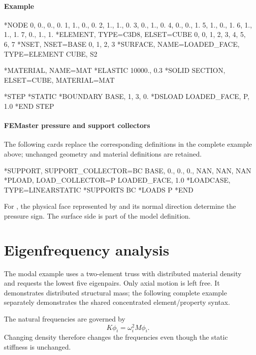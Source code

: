 \paragraph*{Example}

\begin{inputdeck}
*NODE
0, 0., 0., 0.
1, 1., 0., 0.
2, 1., 1., 0.
3, 0., 1., 0.
4, 0., 0., 1.
5, 1., 0., 1.
6, 1., 1., 1.
7, 0., 1., 1.
*ELEMENT, TYPE=C3D8, ELSET=CUBE
0, 0, 1, 2, 3, 4, 5, 6, 7
*NSET, NSET=BASE
0, 1, 2, 3
*SURFACE, NAME=LOADED_FACE,
 TYPE=ELEMENT
CUBE, S2

*MATERIAL, NAME=MAT
*ELASTIC
10000., 0.3
*SOLID SECTION, ELSET=CUBE, MATERIAL=MAT

*STEP
*STATIC
*BOUNDARY
BASE, 1, 3, 0.
*DSLOAD
LOADED_FACE, P, 1.0
*END STEP
\end{inputdeck}

\paragraph*{FEMaster pressure and support collectors}

The following cards replace the corresponding definitions in the
complete example above; unchanged geometry and material definitions
are retained.

\begin{inputdeck}
*SUPPORT, SUPPORT_COLLECTOR=BC
BASE, 0., 0., 0., NAN, NAN, NAN
*PLOAD, LOAD_COLLECTOR=P
LOADED_FACE, 1.0
*LOADCASE, TYPE=LINEARSTATIC
*SUPPORTS
BC
*LOADS
P
*END
\end{inputdeck}

For , the physical face represented by  and its normal direction determine the pressure sign. The surface side is part of the model definition.

\section{Eigenfrequency analysis}

The modal example uses a two-element truss with distributed material density and requests the lowest five eigenpairs. Only axial motion is left free. It demonstrates distributed structural mass; the following complete example separately demonstrates the shared concentrated  element/property syntax.

The natural frequencies are governed by
\[
K\phi_i=\omega_i^2M\phi_i.
\]
Changing density therefore changes the frequencies even though the static stiffness is unchanged.

